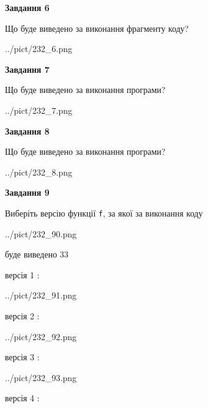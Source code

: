 \documentclass[12pt, ukrainian]{article}
\def\code#1{\Verb!#1!}
\begin{document}
{\begin {large}
{\begin {center}\textbf{Завдання 6}\end {center}}

Що буде виведено за виконання фрагменту коду?\par
\begin{center}
	{../pict/232_6.png}
\end{center}
\newpage

{\begin {center}\textbf{Завдання 7}\end {center}}

Що буде виведено за виконання програми?\par
\begin{center}
	{../pict/232_7.png}
\end{center}
\newpage

{\begin {center}\textbf{Завдання 8}\end {center}}

Що буде виведено за виконання програми?\par
\begin{center}
	{../pict/232_8.png}
\end{center}
\newpage

{\begin {center}\textbf{Завдання 9}\end {center}}

Виберіть версію функції \code{f}, за якої за виконання коду
\begin{center}
	{../pict/232_90.png}
\end{center}
буде виведено 33

\vspace{5mm}
версія 1 :

\begin{center}
	{../pict/232_91.png}
\end{center}
версія 2 :

\begin{center}
	{../pict/232_92.png}
\end{center}
версія 3 :

\begin{center}
	{../pict/232_93.png}
\end{center}
версія 4 :


\end{large}}
\end{document}

